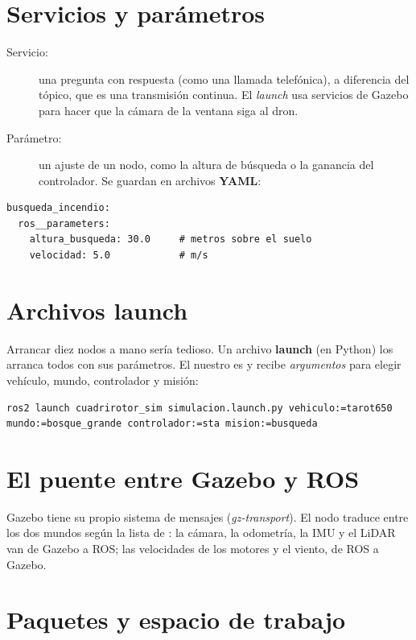 \section{Servicios y parámetros}

\begin{description}
  \item[Servicio:] una pregunta con respuesta (como una llamada telefónica), a diferencia del tópico,
        que es una transmisión continua. El \emph{launch} usa servicios de Gazebo para hacer que la
        cámara de la ventana siga al dron.
  \item[Parámetro:] un ajuste de un nodo, como la altura de búsqueda o la ganancia del controlador.
        Se guardan en archivos \textbf{YAML}:
\end{description}
\begin{lstlisting}
busqueda_incendio:
  ros__parameters:
    altura_busqueda: 30.0     # metros sobre el suelo
    velocidad: 5.0            # m/s
\end{lstlisting}

\section{Archivos launch}

Arrancar diez nodos a mano sería tedioso. Un archivo \textbf{launch} (en Python) los arranca todos
con sus parámetros. El nuestro es  y recibe \emph{argumentos} para
elegir vehículo, mundo, controlador y misión:
\begin{lstlisting}[style=bash]
ros2 launch cuadrirotor_sim simulacion.launch.py vehiculo:=tarot650 mundo:=bosque_grande controlador:=sta mision:=busqueda
\end{lstlisting}

\section{El puente entre Gazebo y ROS}

Gazebo tiene su propio sistema de mensajes (\emph{gz-transport}). El nodo 
traduce entre los dos mundos según la lista de : la cámara, la odometría, la
IMU y el LiDAR van de Gazebo a ROS; las velocidades de los motores y el viento, de ROS a Gazebo.

\section{Paquetes y espacio de trabajo}

